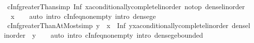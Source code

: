 \begin{isabellebody}
\endisatagproof
{\isafoldproof}%
%
\isadelimproof
\isanewline
%
\endisadelimproof
\isanewline
{}\isamarkupfalse%
\ cInf{\isacharunderscore}{\kern0pt}greaterThan{\isacharbrackleft}{\kern0pt}simp{\isacharbrackright}{\kern0pt}{\isacharcolon}{\kern0pt}\ {\isachardoublequoteopen}Inf\ {\isacharbraceleft}{\kern0pt}x{\isacharcolon}{\kern0pt}{\isacharcolon}{\kern0pt}{\isacharprime}{\kern0pt}a{\isacharcolon}{\kern0pt}{\isacharcolon}{\kern0pt}{\isacharbraceleft}{\kern0pt}conditionally{\isacharunderscore}{\kern0pt}complete{\isacharunderscore}{\kern0pt}linorder{\isacharcomma}{\kern0pt}\ no{\isacharunderscore}{\kern0pt}top{\isacharcomma}{\kern0pt}\ dense{\isacharunderscore}{\kern0pt}linorder{\isacharbraceright}{\kern0pt}\ {\isacharless}{\kern0pt}{\isachardot}{\kern0pt}{\isachardot}{\kern0pt}{\isacharbraceright}{\kern0pt}\ {\isacharequal}{\kern0pt}\ x{\isachardoublequoteclose}\isanewline
%
\isadelimproof
\ \ %
\endisadelimproof
%
\isatagproof
{}\isamarkupfalse%
\ {\isacharparenleft}{\kern0pt}auto\ intro{\isacharbang}{\kern0pt}{\isacharcolon}{\kern0pt}\ cInf{\isacharunderscore}{\kern0pt}eq{\isacharunderscore}{\kern0pt}non{\isacharunderscore}{\kern0pt}empty\ intro{\isacharcolon}{\kern0pt}\ dense{\isacharunderscore}{\kern0pt}ge{\isacharparenright}{\kern0pt}%
\endisatagproof
{\isafoldproof}%
%
\isadelimproof
\isanewline
%
\endisadelimproof
\isanewline
{}\isamarkupfalse%
\ cInf{\isacharunderscore}{\kern0pt}greaterThanAtMost{\isacharbrackleft}{\kern0pt}simp{\isacharbrackright}{\kern0pt}{\isacharcolon}{\kern0pt}\ {\isachardoublequoteopen}y\ {\isacharless}{\kern0pt}\ x\ {\isasymLongrightarrow}\ Inf\ {\isacharbraceleft}{\kern0pt}y{\isacharless}{\kern0pt}{\isachardot}{\kern0pt}{\isachardot}{\kern0pt}x{\isacharcolon}{\kern0pt}{\isacharcolon}{\kern0pt}{\isacharprime}{\kern0pt}a{\isacharcolon}{\kern0pt}{\isacharcolon}{\kern0pt}{\isacharbraceleft}{\kern0pt}conditionally{\isacharunderscore}{\kern0pt}complete{\isacharunderscore}{\kern0pt}linorder{\isacharcomma}{\kern0pt}\ dense{\isacharunderscore}{\kern0pt}linorder{\isacharbraceright}{\kern0pt}{\isacharbraceright}{\kern0pt}\ {\isacharequal}{\kern0pt}\ y{\isachardoublequoteclose}\isanewline
%
\isadelimproof
\ \ %
\endisadelimproof
%
\isatagproof
{}\isamarkupfalse%
\ {\isacharparenleft}{\kern0pt}auto\ intro{\isacharbang}{\kern0pt}{\isacharcolon}{\kern0pt}\ cInf{\isacharunderscore}{\kern0pt}eq{\isacharunderscore}{\kern0pt}non{\isacharunderscore}{\kern0pt}empty\ intro{\isacharcolon}{\kern0pt}\ dense{\isacharunderscore}{\kern0pt}ge{\isacharunderscore}{\kern0pt}bounded{\isacharparenright}{\kern0pt}%

\end{isabellebody}
